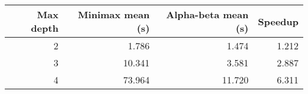\begin{tabular}{|r|r|r|r|}
\hline
   Max depth &   Minimax mean (s) &   Alpha-beta mean (s) &   Speedup
 \\
\hline
           2 &        1.786   &           1.474   &     1.212 \\
           3 &       10.341   &           3.581   &     2.887 \\
           4 &       73.964   &          11.720   &     6.311 \\
\hline
\end{tabular}
